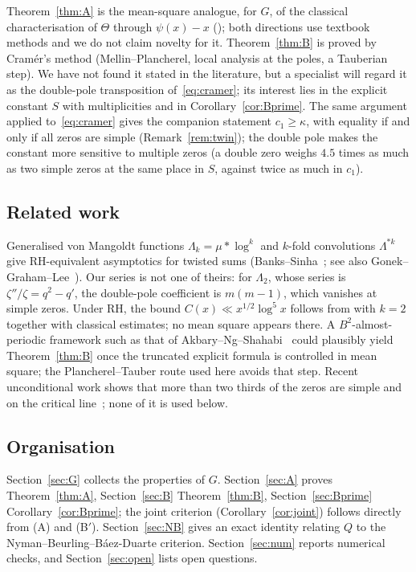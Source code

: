 \documentclass[11pt]{amsart}
\theoremstyle{remark}
\theoremstyle{definition}
\newcommand{\Lam}{\Lambda}
\begin{document}
Theorem~\ref{thm:A} is the mean-square analogue, for $G$, of the classical characterisation of $\Theta$ through $\psi(x)-x$ (\cite[Ch.~13 and 15]{MV07}); both directions use textbook methods and we do not claim novelty for it. Theorem~\ref{thm:B} is proved by Cram\'er's method (Mellin--Plancherel, local analysis at the poles, a Tauberian step). We have not found it stated in the literature, but a specialist will regard it as the double-pole transposition of~\eqref{eq:cramer}; its interest lies in the explicit constant $S$ with multiplicities and in Corollary~\ref{cor:Bprime}. The same argument applied to~\eqref{eq:cramer} gives the companion statement $c_1\ge\kappa$, with equality if and only if all zeros are simple (Remark~\ref{rem:twin}); the double pole makes the constant more sensitive to multiple zeros (a double zero weighs $4.5$ times as much as two simple zeros at the same place in $S$, against twice as much in $c_1$).

\subsection*{Related work} Generalised von Mangoldt functions $\Lam_k=\mu*\log^k$ and $k$-fold convolutions $\Lam^{*k}$ give RH-equivalent asymptotics for twisted sums (Banks--Sinha~\cite{BS22}; see also Gonek--Graham--Lee~\cite{GGL20}). Our series is not one of theirs: for $\Lam_2$, whose series is $\zeta''/\zeta=q^2-q'$, the double-pole coefficient is $m(m-1)$, which vanishes at simple zeros. Under RH, the bound $C(x)\ll x^{1/2}\log^5x$ follows from \cite[Thm.~1.1]{BS22} with $k=2$ together with classical estimates; no mean square appears there. A $B^2$-almost-periodic framework such as that of Akbary--Ng--Shahabi~\cite{ANS14} could plausibly yield Theorem~\ref{thm:B} once the truncated explicit formula is controlled in mean square; the Plancherel--Tauber route used here avoids that step. Recent unconditional work shows that more than two thirds of the zeros are simple and on the critical line~\cite{AF26,Lam26}; none of it is used below.

\subsection*{Organisation} Section~\ref{sec:G} collects the properties of $G$. Section~\ref{sec:A} proves Theorem~\ref{thm:A}, Section~\ref{sec:B} Theorem~\ref{thm:B}, Section~\ref{sec:Bprime} Corollary~\ref{cor:Bprime}; the joint criterion (Corollary~\ref{cor:joint}) follows directly from (A) and (B$'$). Section~\ref{sec:NB} gives an exact identity relating $Q$ to the Nyman--Beurling--B\'aez-Duarte criterion. Section~\ref{sec:num} reports numerical checks, and Section~\ref{sec:open} lists open questions.
\end{document}
